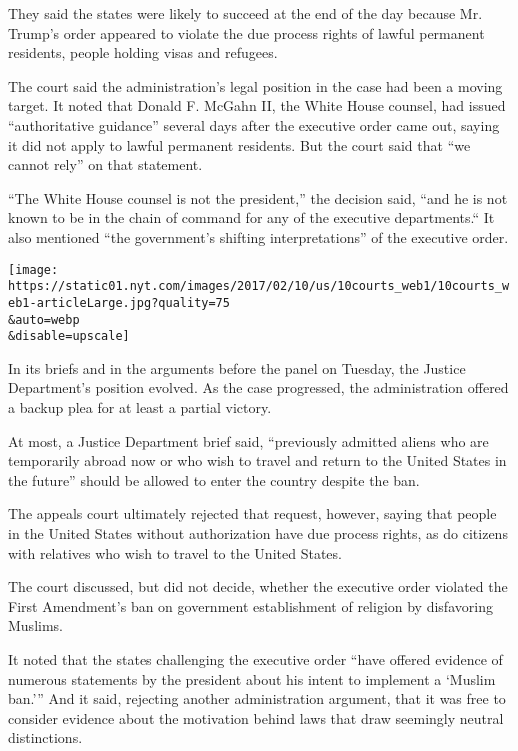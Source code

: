 They said the states were likely to succeed at the end of the day
because Mr. Trump's order appeared to violate the due process rights of
lawful permanent residents, people holding visas and refugees.

The court said the administration's legal position in the case had been
a moving target. It noted that Donald F. McGahn II, the White House
counsel, had issued ``authoritative guidance'' several days after the
executive order came out, saying it did not apply to lawful permanent
residents. But the court said that ``we cannot rely'' on that statement.

``The White House counsel is not the president,'' the decision said,
``and he is not known to be in the chain of command for any of the
executive departments.`` It also mentioned ``the government's shifting
interpretations'' of the executive order.

\texttt{[image: https://static01.nyt.com/images/2017/02/10/us/10courts\_web1/10courts\_web1-articleLarge.jpg?quality=75\\\&auto=webp\\\&disable=upscale]}

In its briefs and in the arguments before the panel on Tuesday, the
Justice Department's position evolved. As the case progressed, the
administration offered a backup plea for at least a partial victory.

At most, a Justice Department brief said, ``previously admitted aliens
who are temporarily abroad now or who wish to travel and return to the
United States in the future'' should be allowed to enter the country
despite the ban.

The appeals court ultimately rejected that request, however, saying that
people in the United States without authorization have due process
rights, as do citizens with relatives who wish to travel to the United
States.

The court discussed, but did not decide, whether the executive order
violated the First Amendment's ban on government establishment of
religion by disfavoring Muslims.

It noted that the states challenging the executive order ``have offered
evidence of numerous statements by the president about his intent to
implement a `Muslim ban.''' And it said, rejecting another
administration argument, that it was free to consider evidence about the
motivation behind laws that draw seemingly neutral distinctions.

\href{https://www.nytimes.com/interactive/2017/01/31/us/politics/trump-immigration-ban-groups.html}{}

